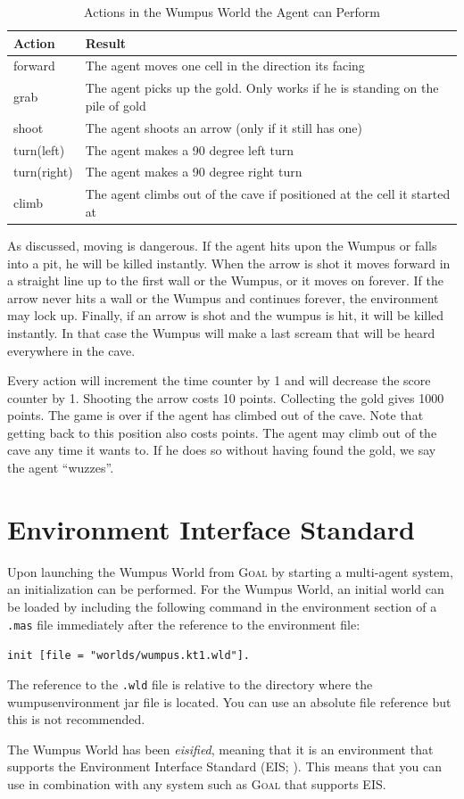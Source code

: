 \documentclass{article}
\newcommand{\GOAL}{\textsc{Goal} }
\begin{document}
\begin{table}[h]
\centering
\begin{tabular}{ll}
\hline
\textbf{Action} & \textbf{Result}\\
\hline
forward & The agent moves one cell in the direction its facing\\
grab & The agent picks up the gold. Only works if he is standing on the pile of
gold\\
shoot & The agent shoots an arrow (only if it still has one)\\
turn(left) & The agent makes a 90 degree left turn\\
turn(right)	& The agent makes a 90 degree right turn\\
climb & The agent climbs out of the cave if positioned at the cell it started
at\\
\hline
\end{tabular}
\caption{Actions in the Wumpus World the Agent can Perform}\label{table:actions}
\end{table}

As discussed, moving is dangerous. If the agent hits upon the Wumpus or falls
into a pit, he will be killed instantly. When the arrow is shot it moves
forward in a straight line up to the first wall or the Wumpus, or it moves on
forever. If the arrow never hits a wall or the Wumpus and continues
forever, the environment may lock up. Finally, if an arrow is shot and
the wumpus is hit, it will be killed instantly. In that case the Wumpus will make a last
scream that will be heard everywhere in the cave. 

Every action will increment the time counter by 1 and will decrease the score
counter by 1. Shooting the arrow costs 10 points. Collecting the gold
gives 1000 points. The game is over if the agent has climbed out of the cave.
Note that getting back to this position also costs points. The agent may
climb out of the cave any time it wants to. If he does so without having
found the gold, we say the agent ``wuzzes''.

%
%
%
\section{Environment Interface Standard}
%
Upon launching the Wumpus World from \GOAL by starting a multi-agent system, an
initialization can be performed. For the Wumpus World, an initial world can be
loaded by including the following command in the environment section of a
\verb|.mas| file immediately after the reference to the environment file:
\begin{center}
\verb|init [file = "worlds/wumpus.kt1.wld"].|
\end{center}
The reference to the \verb|.wld| file is relative to the directory where the wumpusenvironment jar file is located.
You can use an absolute file reference but this is not recommended. 

The Wumpus World has been \textit{eisified}, meaning that it is an environment
that supports the Environment Interface Standard (EIS; \cite{Beh10,EISurl}).
This means that you can use in combination with any system such as \GOAL that
supports EIS.




\end{document}
